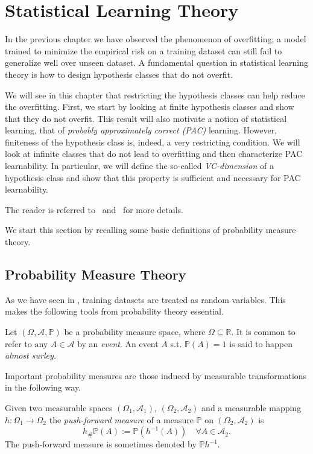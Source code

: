 \chapter{Statistical Learning Theory} %

\label{Chapter2} %
\setcounter{chapter}{2}
In the previous chapter we have observed the phenomenon of overfitting; a model
trained to minimize the empirical risk on a training dataset can still fail to generalize
well over unseen dataset. A fundamental question in statistical learning theory is how to design
hypothesis classes that do not overfit.  

We will see in this chapter that restricting the hypothesis classes can help
reduce the overfitting. First, we start by looking at finite hypothesis classes
and show that they do not overfit. This result will also motivate a notion of statistical learning, that of \emph{probably approximately correct
(PAC)} learning. However, finiteness of the hypothesis class is, indeed, a very
restricting condition. We will look at infinite classes that do not lead to
overfitting and then characterize PAC learnability. In particular, we will
define the so-called \emph{VC-dimension} of a hypothesis class and show that
this property is sufficient and necessary for PAC learnability.

The reader is referred to~\cite{Shalev:ML:2014} and~\cite{Shapire:ThML2019} for more details. 

We start this section by recalling some basic definitions of probability
measure theory.
\section{Probability Measure Theory}
As we have seen in , training datasets are treated as random
variables. This makes the following tools from probability theory essential. 

Let $(\Omega,\mathcal{A}, \mathbb{P})$ be a probability measure space, where $\Omega \subseteq \mathbb{R}$. 
It is common to refer to any $A \in \mathcal{A}$ by an \emph{event}. An event
$A$ s.t. $\mathbb{P}(A)=1$ is said to happen \emph{almost surley.}

Important probability measures are those induced by measurable transformations in the following way. 
\begin{definition}
	Given two measurable spaces $(\Omega_1, \mathcal{A}_1)$, $(\Omega_2, \mathcal{A}_2)$ and a measurable mapping $h:\Omega_1 \to \Omega_2$ 
	the \emph{push-forward measure} of a measure $\mathbb{P}$ on $(\Omega_2, \mathcal{A}_2)$ is 
	$$
	h_\#\mathbb{P} (A) := \mathbb{P} (h^{-1}(A)) \quad  \forall A \in \mathcal{A}_2.
	$$
	The push-forward measure is sometimes denoted by $\mathbb{P} h^{-1}$.
\end{definition}

